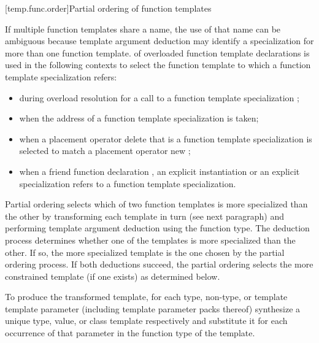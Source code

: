 \documentclass{wg21}
\begin{document}
[temp.func.order]{Partial ordering of function templates}

\pnum
{}%
%
If multiple function templates share a name,
the use of that name can be ambiguous because
template argument deduction  may identify
a specialization for more than one function template.
of overloaded function template declarations is used in the following contexts
to select the function template to which a function template specialization
refers:
\begin{itemize}
    \item
    during overload resolution for a call to a function template specialization ;
    \item
    when the address of a function template specialization is taken;
    \item
    when a placement operator delete that is a
    function template
    specialization
    is selected to match a placement operator new
    ;
    \item
    when a friend function declaration , an
    explicit instantiation  or an explicit specialization  refers to
    a function template specialization.
\end{itemize}

\pnum
Partial ordering selects which of two function templates is more
specialized than the other by transforming each template in turn
(see next paragraph) and performing template argument deduction
using the function type.
The deduction process determines whether
one of the templates is more specialized than the other. If so, the
more specialized template is the one chosen by the partial ordering
process.
If both deductions succeed, the partial ordering selects
the more constrained template (if one exists) as determined below.

\pnum
To produce the transformed template, for each type, non-type, or template
template parameter (including template parameter packs 
thereof) synthesize a unique type, value, or class template
respectively and substitute it for each occurrence of that parameter
in the function type of the template.


\end{document}
